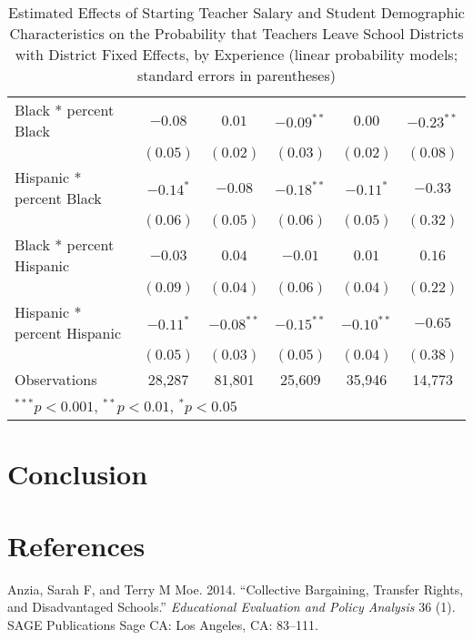 \documentclass[]{article}
\begin{document}
\begin{table}
\begin{center}
\begin{tabular}{l c c c c c }
\quad Black * percent Black                 & $-0.08$       & $0.01$       & $-0.09^{**}$ & $0.00$        & $-0.23^{**}$  \\
                                            & $(0.05)$      & $(0.02)$     & $(0.03)$     & $(0.02)$      & $(0.08)$      \\
\quad Hispanic * percent Black              & $-0.14^{*}$   & $-0.08$      & $-0.18^{**}$ & $-0.11^{*}$   & $-0.33$       \\
                                            & $(0.06)$      & $(0.05)$     & $(0.06)$     & $(0.05)$      & $(0.32)$      \\
\quad Black * percent Hispanic              & $-0.03$       & $0.04$       & $-0.01$      & $0.01$        & $0.16$        \\
                                            & $(0.09)$      & $(0.04)$     & $(0.06)$     & $(0.04)$      & $(0.22)$      \\
\quad Hispanic * percent Hispanic           & $-0.11^{*}$   & $-0.08^{**}$ & $-0.15^{**}$ & $-0.10^{**}$  & $-0.65$       \\
                                            & $(0.05)$      & $(0.03)$     & $(0.05)$     & $(0.04)$      & $(0.38)$      \\
\hline
Observations                                & 28,287         & 81,801        & 25,609        & 35,946         & 14,773         \\
\hline
\multicolumn{6}{l}{\scriptsize{$^{***}p<0.001$, $^{**}p<0.01$, $^*p<0.05$}}
\end{tabular}
\caption{Estimated Effects of Starting Teacher Salary and Student Demographic Characteristics on the Probability that Teachers Leave School Districts with District Fixed Effects, by Experience (linear probability models; standard errors in parentheses)}
\label{tbl:reg_lpm_fe}
\end{center}
\end{table}

\section{Conclusion}\label{conclusion}

\section*{References}\label{references}

\hypertarget{refs}{}
\hypertarget{ref-anzia}{}
Anzia, Sarah F, and Terry M Moe. 2014. ``Collective Bargaining, Transfer
Rights, and Disadvantaged Schools.'' \emph{Educational Evaluation and
Policy Analysis} 36 (1). SAGE Publications Sage CA: Los Angeles, CA:
83--111.
\end{document}
